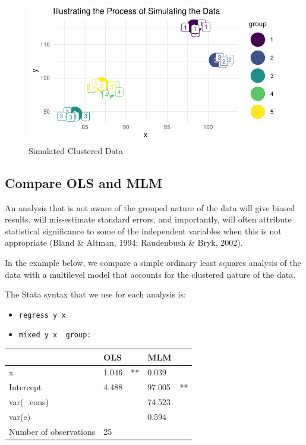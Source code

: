 \documentclass[
  letterpaper,
  DIV=11,
  numbers=noendperiod]{scrreprt}
\providecommand{\tightlist}{%
  \setlength{\itemsep}{0pt}\setlength{\parskip}{0pt}}\usepackage{longtable,booktabs,array}
\begin{document}
\begin{figure}[H]

{\centering \includegraphics{./cross-sectional_files/figure-pdf/unnamed-chunk-3-1.pdf}

}

\caption{Simulated Clustered Data}

\end{figure}

\hypertarget{compare-ols-and-mlm}{%
\subsection{Compare OLS and MLM}\label{compare-ols-and-mlm}}

An analysis that is not aware of the grouped nature of the data will
give biased results, will mis-estimate standard errors, and importantly,
will often attribute statistical significance to some of the independent
variables when this is not appropriate (Bland \& Altman, 1994;
Raudenbush \& Bryk, 2002).

In the example below, we compare a simple ordinary least squares
analysis of the data with a multilevel model that accounts for the
clustered nature of the data.

The Stata syntax that we use for each analysis is:

\begin{itemize}
\tightlist
\item
  \texttt{regress\ y\ x}
\item
  \texttt{mixed\ y\ x\ \textbar{}\textbar{}\ group:}
\end{itemize}

\begin{longtable}[]{@{}lllll@{}}
\toprule()
& OLS & & MLM & \\
\midrule()
\endhead
x & 1.046 & ** & 0.039 & \\
Intercept & 4.488 & & 97.005 & ** \\
var(\_cons) & & & 74.523 & \\
var(e) & & & 0.594 & \\
Number of observations & 25 & & & \\
\bottomrule()
\end{longtable}
\end{document}
